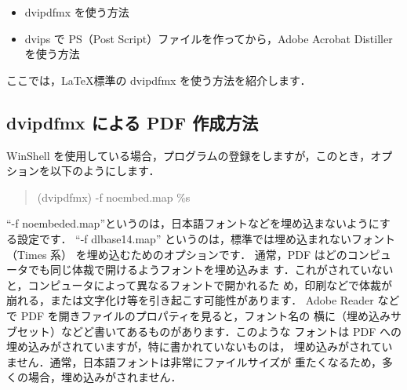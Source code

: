 \documentclass[a4paper, 10pt, dvips, fleqn]{jsarticle}
\begin{document}
\begin{itemize}

\item dvipdfmx を使う方法

\item dvips で PS（Post Script）ファイルを作ってから，Adobe Acrobat
Distillerを使う方法

\end{itemize}

ここでは，\LaTeX 標準の dvipdfmx を使う方法を紹介します．

\subsection{dvipdfmx による PDF 作成方法}

WinShell を使用している場合，プログラムの登録をしますが，このとき，オプ
ションを以下のようにします．

\begin{quote}
 (dvipdfmx) -f noembed.map \%s
\end{quote}

``-f noembeded.map''というのは，日本語フォントなどを埋め込まないようにす
る設定です．
``-f dlbase14.map'' というのは，標準では埋め込まれないフォント（Times 系）
を埋め込むためのオプションです．
通常，PDF はどのコンピュータでも同じ体裁で開けるようフォントを埋め込みま
す．これがされていないと，コンピュータによって異なるフォントで開かれるた
め，印刷などで体裁が崩れる，または文字化け等を引き起こす可能性があります．
Adobe Reader などで PDF を開きファイルのプロパティを見ると，フォント名の
横に（埋め込みサブセット）などど書いてあるものがあります．このような
フォントは PDF への埋め込みがされていますが，特に書かれていないものは，
埋め込みがされていません．通常，日本語フォントは非常にファイルサイズが
重たくなるため，多くの場合，埋め込みがされません．
\end{document}
